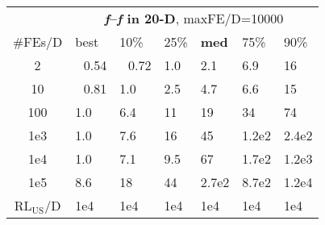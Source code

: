 \begin{tabular}{c|llllll}
 & \multicolumn{6}{|c}{\textbf{\textit{f}\raisebox{-0.35ex}{1}--\textit{f}\raisebox{-0.35ex}{24} in 20-D}, maxFE/D=10000}\\
\#FEs/D & best & 10\% & 25\% & \textbf{med} & 75\% & 90\%\\
2 & ~\,0.54 & ~\,0.72 & \hspace*{1ex}1.0 & \hspace*{1ex}2.1 & \hspace*{1ex}6.9 & 16\\
10 & ~\,0.81 & \hspace*{1ex}1.0 & \hspace*{1ex}2.5 & \hspace*{1ex}4.7 & \hspace*{1ex}6.6 & 15\\
100 & \hspace*{1ex}1.0 & \hspace*{1ex}6.4 & 11 & 19 & 34 & 74\\
1e3 & \hspace*{1ex}1.0 & \hspace*{1ex}7.6 & 16 & 45 & 1.2e2 & 2.4e2\\
1e4 & \hspace*{1ex}1.0 & \hspace*{1ex}7.1 & \hspace*{1ex}9.5 & 67 & 1.7e2 & 1.2e3\\
1e5 & \hspace*{1ex}8.6 & 18 & 44 & 2.7e2 & 8.7e2 & 1.2e4\\
$\text{RL}_{\text{US}}$/D & 1e4 & 1e4 & 1e4 & 1e4 & 1e4 & 1e4
\end{tabular}

